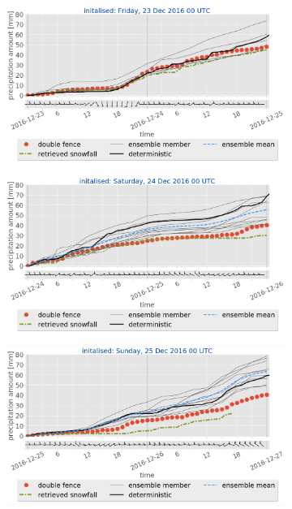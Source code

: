 \begin{figure}[t!]
	\begin{subfigure}[t]{0.49\textwidth}	\includegraphics[trim={0.cm 5.2cm 0.cm 0cm},clip,width=\textwidth]{./fig_sfc_acc/acc_wind_20161223_00}
		\caption{}\label{fig:sfc_acc23}
	\end{subfigure}
	\begin{subfigure}[t]{0.49\textwidth}			\includegraphics[trim={0.cm 5.2cm 0.cm 0cm},clip,width=\textwidth]{./fig_sfc_acc/acc_wind_20161224_00}
		\caption{}\label{fig:sfc_acc24}
	\end{subfigure}
	\begin{subfigure}[t]{0.49\textwidth}
		\includegraphics[trim={0.cm 3.6cm 0.cm 0cm},clip,width=\textwidth]{./fig_sfc_acc/acc_wind_20161225_00}

\end{subfigure}
\end{figure}
